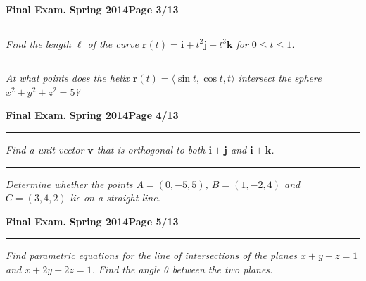 \documentclass[12pt]{article}
\begin{document}
\hfill{\large\bf Final Exam.}\hfill{\large\bf
  Spring 2014}\hfill{\large\bf Page 3/13}\hrule

\bigskip
{\problem[15 pts] \em Find the length $\ell$ of the curve $\boldsymbol{r}(t) =
\boldsymbol{i} + t^2 \boldsymbol{j} + t^3 \boldsymbol{k}$ for $0 \leq t \leq
1$.} 
\vspace{9.5cm}
\begin{flushright}
\end{flushright}
\hrule
{\problem[10 pts] \em At what points does the helix $\boldsymbol{r}(t) = \langle \sin t, \cos t, t \rangle$ intersect the sphere $x^2+y^2+z^2=5$?}
\vspace{7.5cm}
\begin{flushright}
\end{flushright}
\newpage

\hfill{\large\bf Final Exam.}\hfill{\large\bf
  Spring 2014}\hfill{\large\bf Page 4/13}\hrule

\bigskip
{\problem[15 pts] \em Find a unit vector $\boldsymbol{v}$ that is orthogonal
to both $\boldsymbol{i} + \boldsymbol{j}$ and $\boldsymbol{i} +
\boldsymbol{k}$.} 
\vspace{11cm}
\begin{flushright}
\end{flushright}
\hrule
{\problem[10 pts] \em Determine whether the points $A=(0,-5,5)$, $ B=
(1,-2,4)$ and $C=(3,4,2)$ lie on a straight line.}
\newpage

\hfill{\large\bf Final Exam.}\hfill{\large\bf
  Spring 2014}\hfill{\large\bf Page 5/13}\hrule

\bigskip
{\problem[20 pts] \em Find parametric equations for the line of intersections
of the planes $x+y+z=1$ and $x+2y+2z=1$.  Find the angle $\theta$ between the
two planes.}
\vspace{18.5cm}
\begin{flushright}
\end{flushright}
\end{document}
